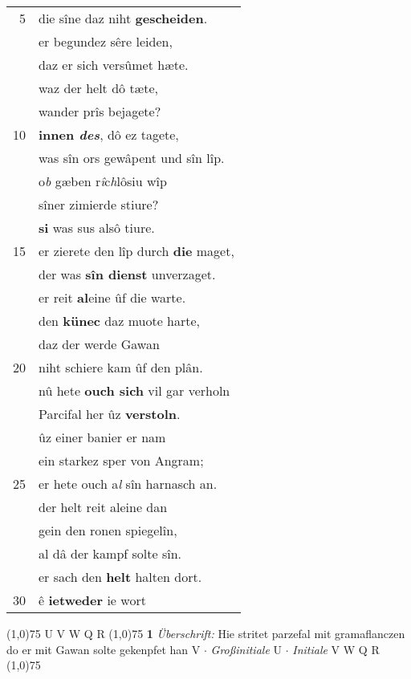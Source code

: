 \documentclass[8pt,a4paper,notitlepage]{article}
\begin{document}
\begin{table}[ht]
\begin{minipage}[t]{0.5\linewidth}
\begin{tabular}{rl}
5 & die sîne daz niht \textbf{gescheiden}.\\ 
 & er begundez sêre leiden,\\ 
 & daz er sich versûmet hæte.\\ 
 & waz der helt dô tæte,\\ 
 & wander prîs bejagete?\\ 
10 & \textbf{innen \textit{des}}, dô ez tagete,\\ 
 & was sîn ors gewâpent und sîn lîp.\\ 
 & o\textit{b} gæben r\textit{î}c\textit{h}lôsiu wîp\\ 
 & sîner zimierde stiure?\\ 
 & \textbf{si} was sus alsô tiure.\\ 
15 & er zierete den lîp durch \textbf{die} maget,\\ 
 & der was \textbf{sîn dienst} unverzaget.\\ 
 & er reit \textbf{al}eine ûf die warte.\\ 
 & den \textbf{künec} daz muote harte,\\ 
 & daz der werde Gawan\\ 
20 & niht schiere kam ûf den plân.\\ 
 & nû hete \textbf{ouch sich} vil gar verholn\\ 
 & Parcifal her ûz \textbf{verstoln}.\\ 
 & ûz einer banier er nam\\ 
 & ein starkez sper von Angram;\\ 
25 & er hete ouch a\textit{l} sîn harnasch an.\\ 
 & der helt reit aleine dan\\ 
 & gein den ronen spiegelîn,\\ 
 & al dâ der kampf solte sîn.\\ 
 & er sach den \textbf{helt} halten dort.\\ 
30 & ê \textbf{ietweder} ie wort\\ 
\end{tabular}
\scriptsize
\line(1,0){75} \newline
U V W Q R \newline
\line(1,0){75} \newline
\textbf{1} \textit{Überschrift:} Hie stritet parzefal mit gramaflanczen do er mit Gawan solte gekenpfet han V   $\cdot$ \textit{Großinitiale} U   $\cdot$ \textit{Initiale} V W Q R  \newline
\line(1,0){75} \newline

\end{minipage}
\end{table}
\end{document}
